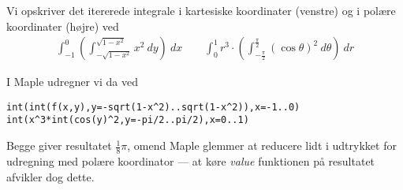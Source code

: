 \documentclass[11pt,a4paper]{article}
\newcommand{\with}[1]{{\ }d#1}
\newcommand{\Int}[4]{\int_{#1}^{#2}#3\with{#4}}
\begin{document}
Vi opskriver det itererede integrale i kartesiske koordinater (venstre) og
i polære koordinater (højre) ved
\begin{align}
    \Int{-1}{0}{\left( \Int{-\sqrt{1 - x^2}}{\sqrt{1 - x^2}}{x^2}{y} \right)}{x}
    \qquad
    \Int{0}{1}{r^3 \cdot \left( \Int{-\frac{\pi}{2}}{\frac{\pi}{2}}{(\cos \theta)^2}{\theta} \right)}{r}
\end{align}

I Maple udregner vi da ved
\begin{lstlisting}
int(int(f(x,y),y=-sqrt(1-x^2)..sqrt(1-x^2)),x=-1..0)
int(x^3*int(cos(y)^2,y=-pi/2..pi/2),x=0..1)
\end{lstlisting}

Begge giver resultatet $\frac{1}{8}\pi$, omend Maple glemmer at reducere lidt
i udtrykket for udregning med polære koordinator --- at køre {\it value}
funktionen på resultatet afvikler dog dette.

\iffalse
\section
{
    \mdseries
    Udtryk mængden
}
\begin{align}
    R = \{ (x,y,z) \in \mathbb{R}^3{\ }|{\ }0 \leq y, x^2 + y^2 + z^2 \leq 1 \}
\end{align}
\section*
{
    \mdseries
    i sfæriske koordinater, og udregn derefter rumintegralet af funktionen
    $f(x,y,z) = y$ over $R$.
}
...
\fi
\end{document}
